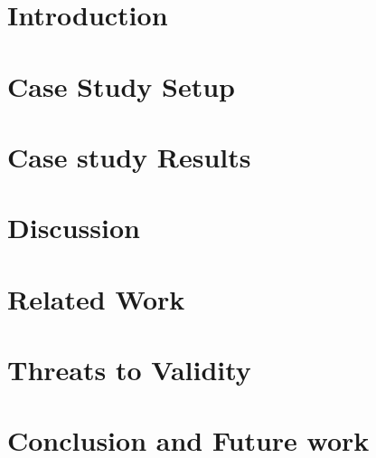 \documentclass{sig-alternate}
\begin{document}

\terms{}

\keywords{}

\section{Introduction}
\label{sec:introduction}


% 

\section{Case Study Setup}
\label{sec:approach}


\section{Case study Results}
\label{sec:case_study_results}


\section{Discussion}
\label{sec:discussion}


\section{Related Work}
\label{sec:related_work}



\section{Threats to Validity}
\label{sec:threats_to_validity}


\section{Conclusion and Future work}
\label{sec:conclusion}



\balance
  
\end{document}
